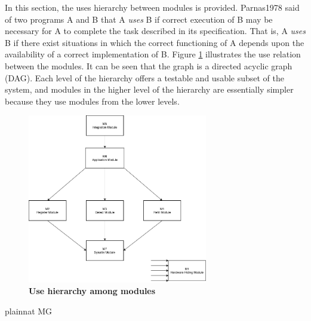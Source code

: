 \documentclass[12pt, titlepage]{article}
\begin{document}
In this section, the uses hierarchy between modules is
provided. Parnas1978 said of two programs A and B that A {\em uses} B if
correct execution of B may be necessary for A to complete the task described in
its specification. That is, A {\em uses} B if there exist situations in which
the correct functioning of A depends upon the availability of a correct
implementation of B.  Figure \ref{FigUH} illustrates the use relation between
the modules. It can be seen that the graph is a directed acyclic graph
(DAG). Each level of the hierarchy offers a testable and usable subset of the
system, and modules in the higher level of the hierarchy are essentially simpler
because they use modules from the lower levels.

\begin{figure}[H]
\centering
\includegraphics[width=0.7\textwidth]{UsesHierarchy.png}
\caption{\bf Use hierarchy among modules}
\label{FigUH}
\end{figure}


 {plainnat}
 {MG}
\end{document}
